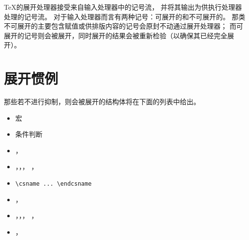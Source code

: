 \documentclass{book}
\begin{document}
{\TeX}的展开处理器接受来自输入处理器中的记号流，
并将其输出为供执行处理器处理的记号流。
对于输入处理器而言有两种记号：可展开的和不可展开的。
那类不可展开的主要包含赋值或供排版内容的记号会原封不动通过展开处理器；
而可展开的记号则会被展开，同时展开的结果会被重新检验（以确保其已经完全展开）。

\section{展开惯例}

那些若不进行抑制，则会被展开的结构体将在下面的列表中给出。
\begin{itemize}
\item 宏\label{expand:lijst}
\item 条件判断
\item {}，
\item {}，，，
      ，
\item \verb,\csname ... \endcsname,
\item {}，
\item {}，，，
      ，
\item {}，
\end{itemize}
\end{document}
